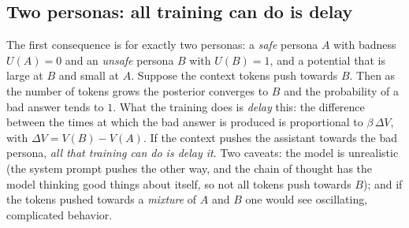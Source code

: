 \subsection{Two personas: all training can do is delay}\label{sec:L7-two}
The first consequence is for exactly two personas: a \emph{safe} persona $A$ with badness $U(A)=0$ and an \emph{unsafe} persona $B$ with $U(B)=1$, and a potential that is large at $B$ and small at $A$. Suppose the context tokens push towards $B$. Then as the number of tokens grows the posterior converges to $B$ and the probability of a bad answer tends to $1$. What the training does is \emph{delay} this: the difference between the times at which the bad answer is produced is proportional to $\beta\,\Delta V$, with $\Delta V=V(B)-V(A)$. If the context pushes the assistant towards the bad persona, \emph{all that training can do is delay it}. Two caveats: the model is unrealistic (the system prompt pushes the other way, and the chain of thought has the model thinking good things about itself, so not all tokens push towards $B$); and if the tokens pushed towards a \emph{mixture} of $A$ and $B$ one would see oscillating, complicated behavior.

